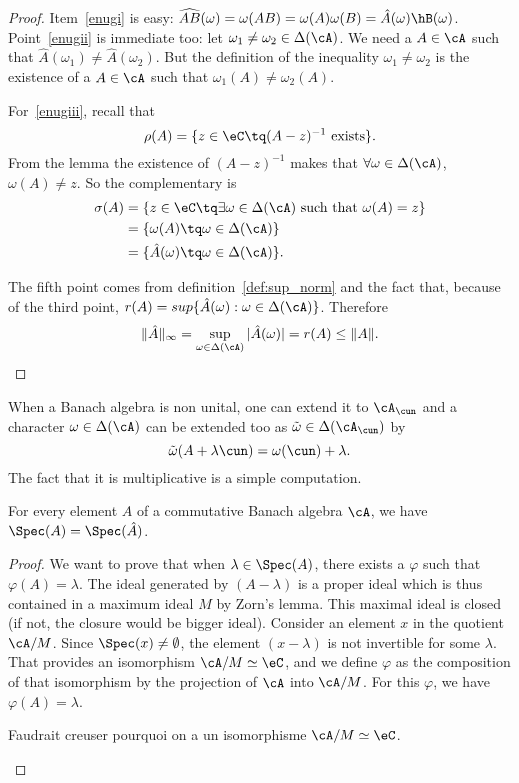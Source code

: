 \begin{proof}
	Item~\ref{enugi} is easy: $\widehat{AB}(\omega)=\omega(AB)=\omega(A)\omega(B)=\hat A(\omega)\hB(\omega)$. Point~\ref{enugii} is immediate too: let $\omega_1\neq\omega_2\in\Delta(\cA)$. We need a $A\in\cA$ such that $\hat A(\omega_1)\neq\hat A(\omega_2)$. But the definition of the inequality $\omega_1\neq\omega_2$ is the existence of a $A\in\cA$ such that $\omega_1(A)\neq\omega_2(A)$.

	For~\ref{enugiii}, recall that
	\[
		\rho(A)=\{z\in\eC\tq(A-z)^{-1}\textrm{ exists}\}.
	\]
	From the lemma the existence of $(A-z)^{-1}$ makes that $\forall\omega\in\Delta(\cA)$, $\omega(A)\neq z$. So the complementary is
	\begin{equation}
		\begin{split}
			\sigma(A)&=\{z\in\eC\tq\exists\omega\in\Delta(\cA)\textrm{ such that }\omega(A)=z\}\\
			&=\{\omega(A)\tq\omega\in\Delta(\cA)\}\\
			&=\{\hat A(\omega)\tq\omega\in\Delta(\cA)\}.
		\end{split}
	\end{equation}

	The fifth point comes from definition~\ref{def:sup_norm} and the fact that, because of the third point,  $r(A)=sup\{\hat A(\omega):\omega\in\Delta(\cA)\}$.
	Therefore
	\[
		\|\hat A\|_{\infty}=\sup_{\omega\in\Delta(\cA)}|\hat A(\omega)|=r(A)\leq\|A\|.
	\]
\end{proof}

When a Banach algebra is non unital, one can extend it to $\cA_{\cun}$ and a character $\omega\in\Delta(\cA)$ can be extended too as $\tilde{\omega}\in\Delta(\cA_{\cun})$ by
\[
	\tilde{\omega}(A+\lambda\cun)=\omega(\cun)+\lambda.
\]
The fact that it is multiplicative is a simple computation.

\begin{theorem}
	For every element $A$ of a commutative Banach algebra $\cA$, we have $\Spec(A)=\Spec(\hat A)$.
\end{theorem}

\begin{proof}
	We want to prove that when $\lambda\in\Spec(A)$, there exists a $\varphi$ such that $\varphi(A)=\lambda$. The ideal generated by $(A-\lambda)$ is a proper ideal which is thus contained in a maximum ideal $M$ by Zorn's lemma. This maximal ideal is closed (if not, the closure would be bigger ideal). Consider an element $x$ in the quotient $\cA/M$. Since $\Spec(x)\neq\emptyset$, the element $(x-\lambda)$ is not invertible for some $\lambda$. That provides an isomorphism $\cA/M\simeq \eC$, and we define $\varphi$ as the composition of that isomorphism by the projection of $\cA$ into $\cA/M$. For this $\varphi$, we have $\varphi(A)=\lambda$.

	\begin{probleme}
		Faudrait creuser pourquoi on a un isomorphisme $\cA/M\simeq\eC$.
	\end{probleme}
\end{proof}

